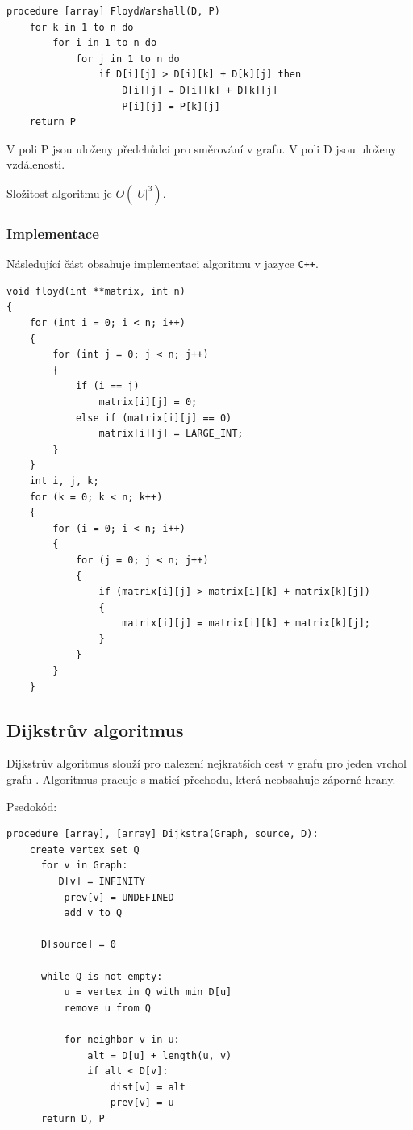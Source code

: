 \documentclass[a4paper,10pt]{article}
\begin{document}
\begin{verbatim}
procedure [array] FloydWarshall(D, P)
    for k in 1 to n do
        for i in 1 to n do
            for j in 1 to n do
                if D[i][j] > D[i][k] + D[k][j] then
                    D[i][j] = D[i][k] + D[k][j]
                    P[i][j] = P[k][j]
    return P
\end{verbatim}

V poli P jsou uloženy předchůdci pro směrování v grafu. V poli D jsou uloženy vzdálenosti.

Složitost algoritmu je $O (|U|^3)$.

\subsubsection{Implementace}

Následující část obsahuje implementaci algoritmu v jazyce \texttt{C++}.

\begin{verbatim}
void floyd(int **matrix, int n)
{
    for (int i = 0; i < n; i++)
    {
        for (int j = 0; j < n; j++)
        {
            if (i == j)
                matrix[i][j] = 0;
            else if (matrix[i][j] == 0)
                matrix[i][j] = LARGE_INT;
        }
    }
    int i, j, k;
    for (k = 0; k < n; k++)
    {
        for (i = 0; i < n; i++)
        {
            for (j = 0; j < n; j++)
            {
                if (matrix[i][j] > matrix[i][k] + matrix[k][j])
                {
                    matrix[i][j] = matrix[i][k] + matrix[k][j];
                }
            }
        }
    }
\end{verbatim}

\subsection{Dijkstrův algoritmus}

Dijkstrův algoritmus slouží pro nalezení nejkratších cest v grafu pro jeden vrchol grafu \cite{dijskraAlg}. Algoritmus pracuje s maticí přechodu, která neobsahuje záporné hrany.

Psedokód:

\begin{verbatim}
procedure [array], [array] Dijkstra(Graph, source, D):
    create vertex set Q
      for v in Graph:
         D[v] = INFINITY
          prev[v] = UNDEFINED
          add v to Q

      D[source] = 0 
      
      while Q is not empty:
          u = vertex in Q with min D[u]
          remove u from Q 
          
          for neighbor v in u:
              alt = D[u] + length(u, v)
              if alt < D[v]:
                  dist[v] = alt 
                  prev[v] = u 
      return D, P
\end{verbatim}
\end{document}
